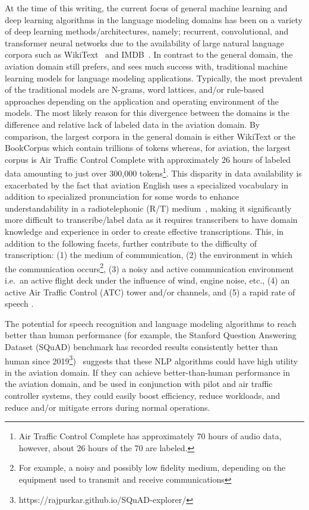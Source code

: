 \documentclass[12pt]{article}
\begin{document}
At the time of this writing, the current focus of general machine learning and deep learning algorithms in the language modeling domains has been on a
variety of deep learning methods/architectures, namely; recurrent, convolutional, and transformer neural networks due to the availability of large
natural language corpora such as WikiText~\cite{merity_pointer_2016} and IMDB~\cite{maas_learning_2011}. In contrast to the general domain, the
aviation domain still prefers, and sees much success with, traditional machine learning models for language modeling applications. Typically, the most
prevalent of the traditional models are N-grams, word lattices, and/or rule-based approaches depending on the application and operating environment of
the models. The most likely reason for this divergence between the domains is the difference and relative lack of labeled data in the
aviation domain. By comparison, the largest corpora in the general domain is either WikiText or the BookCorpus which contain trillions of tokens
whereas, for aviation, the largest corpus is Air Traffic Control Complete with approximately 26 hours of labeled data amounting to just over 300,000
tokens\footnote{Air Traffic Control Complete has approximately 70 hours of audio data, however, about 26 hours of the 70 are labeled.}. This disparity
in data availability is exacerbated by the fact that aviation English uses a specialized vocabulary in addition to specialized pronunciation for some
words to enhance understandability in a radiotelephonic (R/T) medium~\cite{paltridge_handbook_2013}, making it significantly more difficult to
transcribe/label data as it requires transcribers to have domain knowledge and experience in order to create effective transcriptions. This, in
addition to the following facets, further contribute to the difficulty of transcription: (1) the medium of communication, (2) the environment in which
the communication occurs\footnote{For example, a noisy and possibly low fidelity medium, depending on the equipment used to transmit and receive
    communications}, (3) a noisy and active communication environment i.e.~an active flight deck under the influence of wind, engine noise, etc., (4)
an active Air Traffic Control (ATC) tower and/or channels, and (5) a rapid rate of speech \cite{paltridge_handbook_2013}.

The potential for speech recognition and language modeling algorithms to reach better than human performance (for example, the Stanford Question
Answering Dataset (SQuAD) benchmark has recorded results consistently better than human since
2019\footnote{https://rajpurkar.github.io/SQuAD-explorer/})~\cite{zhang_ai_2022} suggests that these NLP algorithms could have high utility in the
aviation domain. If they can achieve better-than-human performance in the aviation domain, and be used in conjunction with pilot and air traffic
controller systems, they could easily boost efficiency, reduce workloads, and reduce and/or mitigate errors during normal operations.
\end{document}
